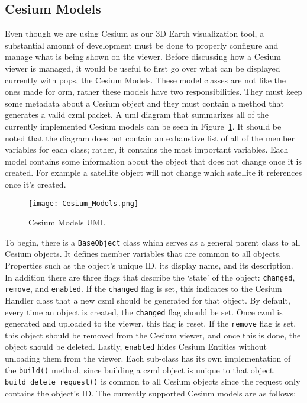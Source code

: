\subsection{Cesium Models}\label{sec:cesium-models}

Even though we are using Cesium as our 3D Earth visualization tool, a
substantial amount of development must be done to properly configure and manage
what is being shown on the viewer. Before discussing how a Cesium viewer is
managed, it would be useful to first go over what can be displayed currently
with \gls{pops}, the Cesium Models. These model classes are not like the ones
made for \gls{orm}, rather these models have two responsibilities. They must
keep some metadata about a Cesium object and they must contain a method that
generates a valid \gls{czml} packet.  A \gls{uml} diagram that summarizes all
of the currently implemented Cesium models can be seen in
Figure~\ref{fig:cesium_models}. It should be noted that the diagram does not
contain an exhaustive list of all of the member variables for each class;
rather, it contains the most important variables.  Each model contains some
information about the object that does not change once it is created. For
example a satellite object will not change which satellite it references once
it's created. 

\begin{figure} 
    \centering
    \texttt{[image: Cesium\_Models.png]} 
    \caption{Cesium Models UML} 
    \label{fig:cesium_models} 
\end{figure}

To begin, there is a \texttt{BaseObject} class which serves as a general parent
class to all Cesium objects. It defines member variables that are common to all
objects. Properties such as the object's unique ID, its display name, and its
description. In addition there are three flags that describe the `state' of the
object: \texttt{changed}, \texttt{remove}, and \texttt{enabled}. If the
\texttt{changed} flag is set, this indicates to the Cesium Handler class that a
new \gls{czml} should be generated for that object. By default, every time an
object is created, the \texttt{changed} flag should be set. Once \gls{czml} is
generated and uploaded to the viewer, this flag is reset. If the
\texttt{remove} flag is set, this object should be removed from the Cesium
viewer, and once this is done, the object should be deleted. Lastly,
\texttt{enabled} hides Cesium Entities without unloading them from the viewer.
Each sub-class has its own implementation of the \texttt{build()} method, since
building a \gls{czml} object is unique to that object.
\texttt{build\_delete\_request()} is common to all Cesium objects since the
request only contains the object's ID. The currently supported Cesium models
are as follows:

